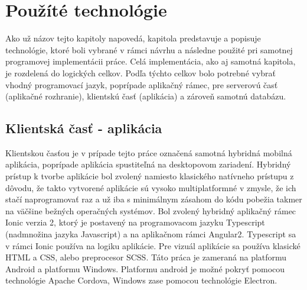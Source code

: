 \chapter{Použíté technológie}
\label{chap:pouzite-techologie}
Ako už názov tejto kapitoly napovedá, kapitola predstavuje a popisuje technológie, ktoré boli vybrané v rámci návrhu a následne použité pri samotnej programovej implementácii práce. Celá implementácia, ako aj samotná kapitola, je rozdelená do logických celkov. Podľa týchto celkov bolo potrebné vybrať vhodný programovací jazyk, poprípade aplikačný rámec, pre serverovú časť (aplikačné rozhranie), klientskú časť (aplikácia) a zároveň samotnú databázu.

\section{Klientská časť - aplikácia}
Klientskou časťou je v prípade tejto práce označená samotná hybridná mobilná aplikácia, poprípade aplikácia spustiteľná na desktopovom zariadení. Hybridný prístup k tvorbe aplikácie bol zvolený namiesto klasického natívneho prístupu z dôvodu, že takto vytvorené aplikácie sú vysoko multiplatformné v zmysle, že ich stačí naprogramovať raz a už iba s minimálnym zásahom do kódu pobežia takmer na väčšine bežných operačných systémov. Bol zvolený hybridný aplikačný rámec Ionic verzia 2, ktorý je postavený na programovacom jazyku Typescript (nadmnožina jazyka Javascript) a na aplikačnom rámci Angular2. Typescript sa v rámci Ionic používa na logiku aplikácie. Pre vizuál aplikácie sa používa klasické HTML a CSS, alebo preprocesor SCSS. Táto práca je zameraná na  platformu Android a platformu Windows. Platformu android je možné pokryť pomocou technológie Apache Cordova, Windows zase pomocou technológie Electron. 
